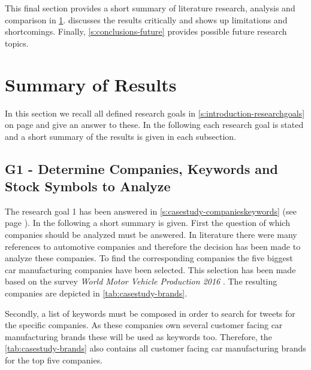 This final section provides a short summary of literature research, analysis and comparison in \cref{s:conclusions-summary}.
 discusses the results critically and shows up limitations and shortcomings. 
Finally, \cref{s:conclusions-future} provides possible future research topics.

\section{Summary of Results}
\label{s:conclusions-summary}

In this section we recall all defined research goals in \cref{s:introduction-researchgoals} on page \pageref{s:introduction-researchgoals} and give an answer to these.
In the following each research goal is stated and a short summary of the results is given in each subsection.


\subsection{G1 - Determine Companies, Keywords and Stock Symbols to Analyze}
\label{ss:conclusion-summary-g1}


The research goal 1 has been answered in \cref{s:casestudy-companieskeywords} (see page \pageref{s:casestudy-companieskeywords}).
In the following a short summary is given.
First the question of which companies should be analyzed must be answered.
In literature there were many references to automotive companies and therefore the decision has been made to analyze these companies.
To find the corresponding companies the five biggest car manufacturing companies have been selected.
This selection has been made based on the survey \emph{World Motor Vehicle Production 2016} \citep{OICA2016}. 
The resulting companies are depicted in \cref{tab:casestudy-brands}.

Secondly, a list of keywords must be composed in order to search for tweets for the specific companies.
As these companies own several customer facing car manufacturing brands these will be used as keywords too.
Therefore, the \cref{tab:casestudy-brands} also contains all customer facing car manufacturing brands for the top five companies.

